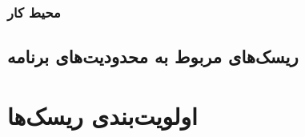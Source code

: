 \subsubsection{محیط کار}


\subsection{ریسک‌های مربوط به محدودیت‌های برنامه}


\section{اولویت‌بندی ریسک‌ها}

